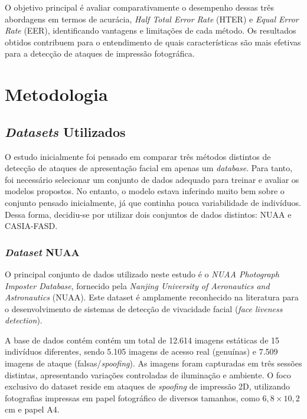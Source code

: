 \documentclass[
	article,			%
	11pt,				%
	oneside,			%
	a4paper,			%
	english,			%
	brazil,				%
	sumario=tradicional
	]{abntex2}
\begin{document}
O objetivo principal é avaliar comparativamente o desempenho dessas três abordagens em termos de acurácia, \textit{Half Total Error Rate} (HTER) e \textit{Equal Error Rate} (EER), identificando vantagens e limitações de cada método. Os resultados obtidos contribuem para o entendimento de quais características são mais efetivas para a detecção de ataques de impressão fotográfica.

\section{Metodologia}
\subsection{\textit{Datasets} Utilizados}
O estudo inicialmente foi pensado em comparar três métodos distintos de detecção de ataques de apresentação facial em apenas um \textit{database}. Para tanto, foi necessário selecionar um conjunto de dados adequado para treinar e avaliar os modelos propostos. No entanto, o modelo estava inferindo muito bem sobre o conjunto pensado inicialmente, já que continha pouca variabilidade de indivíduos. Dessa forma, decidiu-se por utilizar dois conjuntos de dados distintos: NUAA e CASIA-FASD.

\subsubsection{\textit{Dataset} NUAA}
O principal conjunto de dados utilizado neste estudo é o \textit{NUAA Photograph Imposter Database}, fornecido pela \textit{Nanjing University of Aeronautics and Astronautics} (NUAA). Este dataset é amplamente reconhecido na literatura para o desenvolvimento de sistemas de detecção de vivacidade facial (\textit{face liveness detection}).

A base de dados contém contém um total de 12.614 imagens estáticas de 15 indivíduos diferentes, sendo 5.105 imagens de acesso real (genuínas) e 7.509 imagens de ataque (falsas/\textit{spoofing}). As imagens foram capturadas em três sessões distintas, apresentando variações controladas de iluminação e ambiente. O foco exclusivo do dataset reside em ataques de \textit{spoofing} de impressão 2D, utilizando fotografias impressas em papel fotográfico de diversos tamanhos, como $6,8 \times 10,2$ cm e papel A4.
\end{document}
